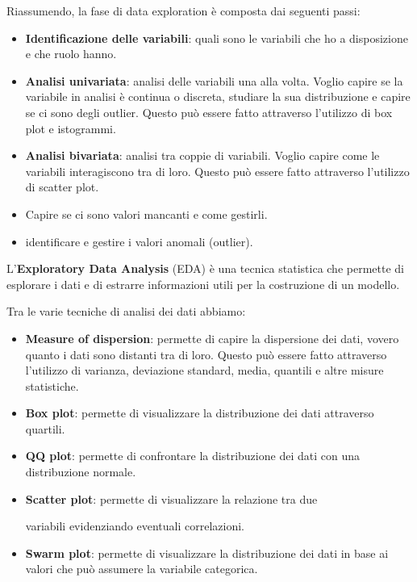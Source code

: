Riassumendo, la fase di data exploration è composta dai seguenti passi:
\begin{itemize}
      \item \textbf{Identificazione delle variabili}: quali sono le variabili che ho
            a disposizione e che ruolo hanno.
      \item \textbf{Analisi univariata}: analisi delle variabili una alla volta.
            Voglio capire se la variabile in analisi è continua o discreta,
            studiare la sua distribuzione e capire se ci sono degli outlier. Questo
            può essere fatto attraverso l'utilizzo di box plot e istogrammi.
      \item \textbf{Analisi bivariata}: analisi tra coppie di variabili. Voglio
            capire come le variabili interagiscono tra di loro. Questo può essere
            fatto attraverso l'utilizzo di scatter plot.
      \item Capire se ci sono valori mancanti e come gestirli.
      \item identificare e gestire i valori anomali (outlier).
\end{itemize}

\begin{definizione}
      L'\textbf{Exploratory Data Analysis} (EDA) è una tecnica statistica che permette
      di esplorare i dati e di estrarre informazioni utili per la costruzione di un
      modello.
\end{definizione}

Tra le varie tecniche di analisi dei dati abbiamo:
\begin{itemize}
      \item \textbf{Measure of dispersion}: permette di capire la dispersione
            dei dati, vovero quanto i dati sono
            distanti tra di loro. Questo può essere fatto attraverso l'utilizzo
            di varianza, deviazione standard, media, quantili e altre misure statistiche.

      \item \textbf{Box plot}: permette di visualizzare la distribuzione dei dati
            attraverso quartili.
      \item \textbf{QQ plot}: permette di confrontare la distribuzione dei dati
            con una distribuzione normale.
      \item \textbf{Scatter plot}: permette di visualizzare la relazione tra due

            variabili evidenziando eventuali correlazioni.
      \item \textbf{Swarm plot}: permette di visualizzare la distribuzione dei dati
            in base ai valori che può assumere la variabile categorica.
\end{itemize}

